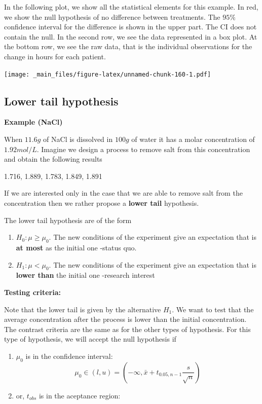 \documentclass[
]{book}
\begin{document}
In the following plot, we show all the statistical elements for this example. In red, we show the null hypothesis of no difference between treatments. The \(95\%\) confidence interval for the difference is shown in the upper part. The CI does not contain the null. In the second row, we see the data represented in a box plot. At the bottom row, we see the raw data, that is the individual observations for the change in hours for each patient.

\texttt{[image: \_main\_files/figure-latex/unnamed-chunk-160-1.pdf]}

\hypertarget{lower-tail-hypothesis}{%
\subsection{Lower tail hypothesis}\label{lower-tail-hypothesis}}

\textbf{Example (NaCl)}

When \(11.6g\) of NaCl is dissolved in \(100 g\) of water it has a molar concentration of \(1.92 mol/L\). Imagine we design a process to remove salt from this concentration and obtain the following results

1.716, 1.889, 1.783, 1.849, 1.891

If we are interested only in the case that we are able to remove salt from the concentration then we rather propose a \textbf{lower tail} hypothesis.

The lower tail hypothesis are of the form

\begin{enumerate}
\def\labelenumi{\alph{enumi}.}
\item
  \(H_0:\mu \geq \mu_0\). The new conditions of the experiment give an expectation that is \textbf{at most} as the initial one -status quo.
\item
  \(H_1:\mu < \mu_0\). The new conditions of the experiment give an expectation that is \textbf{lower than} the initial one -research interest
\end{enumerate}

\textbf{Testing criteria:}

Note that the lower tail is given by the alternative \(H_1\). We want to test that the average concentration after the process is lower than the initial concentration. The contrast criteria are the same as for the other types of hypothesis. For this type of hypothesis, we will accept the null hypothesis if

\begin{enumerate}
\def\labelenumi{\arabic{enumi}.}
\item
  \(\mu_0\) is in the confidence interval:
  \[\mu_0\in (l,u)=(-\infty, \bar{x}+t_{0.05,n-1} \frac{s}{\sqrt{n}})\]
\item
  or, \(t_{obs}\) is in the aceptance region:
\end{enumerate}
\end{document}
